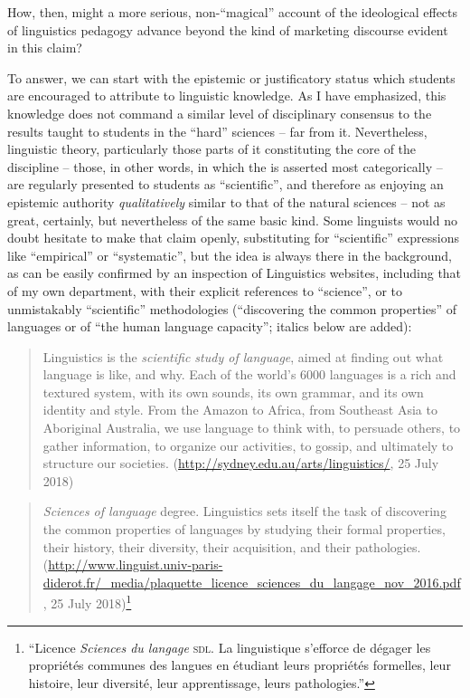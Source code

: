 \documentclass[output=paper]{langscibook}
\begin{document}
How, then, might a more serious, non-``magical'' account of the ideological effects of linguistics pedagogy advance beyond the kind of marketing discourse evident in this claim?

To answer, we can start with the epistemic or justificatory status which students are encouraged to attribute to linguistic knowledge. As I have emphasized, this knowledge does not command a similar level of disciplinary consensus to the results taught to students in the ``hard'' sciences -- far from it.  Nevertheless, linguistic theory, particularly those parts of it constituting the core of the discipline -- those, in other words, in which the  is asserted most categorically -- are regularly presented to students as ``scientific'', and therefore as enjoying an epistemic authority \emph{qualitatively} similar to that of the natural sciences -- not as great, certainly, but nevertheless of the same basic kind. Some linguists would no doubt hesitate to make that claim openly, substituting for ``scientific'' expressions like ``empirical'' or ``systematic'', but the idea is always there in the background, as can be easily confirmed by an inspection of Linguistics websites, including that of my own department, with their explicit references to ``science'', or to unmistakably ``scientific'' methodologies (``discovering the common properties'' of languages or of ``the human language capacity''; italics below are added):

\begin{quotation}
Linguistics is the \emph{scientific study of language}, aimed at finding out what language is like, and why. Each of the world's 6000 languages is a rich and textured system, with its own sounds, its own grammar, and its own identity and style. From the Amazon to Africa, from Southeast Asia to Aboriginal Australia, we use language to think with, to persuade others, to gather information, to organize our activities, to gossip, and ultimately to structure our societies.
(\url{http://sydney.edu.au/arts/linguistics/}, 25 July 2018)
\end{quotation}

\begin{quotation}
\emph{Sciences of language} degree. Linguistics sets itself the task of discovering the common properties of languages by studying their formal properties, their history, their diversity, their acquisition, and their pathologies.
(\url{http://www.linguist.univ-paris-diderot.fr/\_media/plaquette_licence_sciences_du_langage_nov_2016.pdf}, 25 July 2018)\footnote{``Licence \emph{Sciences du langage} \textsc{sdl}. La linguistique s'efforce de dégager les propriétés communes des langues en étudiant leurs propriétés formelles, leur histoire, leur diversité, leur apprentissage, leurs pathologies.''}
\end{quotation}
\end{document}
